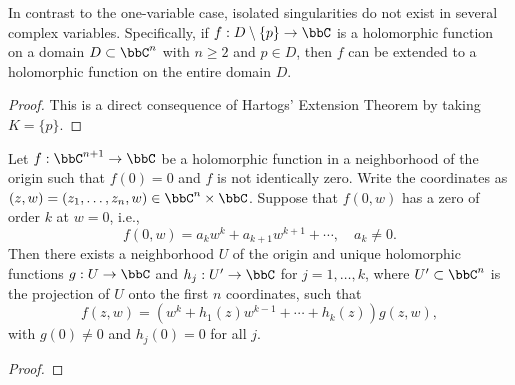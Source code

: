 \begin{corollary}\label{cor:nonexistence_of_isolated_singularities_in_several_complex_variables}
	In contrast to the one-variable case, isolated singularities do not exist in several complex variables.
	Specifically, if \(f: D \setminus \{p\} \to \bbC\) is a holomorphic function on a domain \(D \subset \bbC^n\) with \(n \geq 2\) and \(p \in D\), then \(f\) can be extended to a holomorphic function on the entire domain \(D\).
\end{corollary}
\begin{proof}
	This is a direct consequence of Hartogs' Extension Theorem by taking \(K = \{p\}\).
\end{proof}
\begin{theorem}\label{thm:Weierstrass_Preparation_Theorem}
	Let \(f: \bbC^{n+1} \to \bbC\) be a holomorphic function in a neighborhood of the origin such that \(f(0) = 0\) and \(f\) is not identically zero.
	Write the coordinates as \((z,w) = (z_1, \ldots, z_n, w) \in \bbC^{n} \times \bbC\).
	Suppose that \(f(0,w)\) has a zero of order \(k\) at \(w = 0\), i.e.,
	\[ f(0,w) = a_k w^k + a_{k+1} w^{k+1} + \cdots, \quad a_k \neq 0. \]
	Then there exists a neighborhood \(U\) of the origin and unique holomorphic functions \(g: U \to \bbC\) and \(h_j: U' \to \bbC\) for \(j = 1, \ldots, k\), where \(U' \subset \bbC^n\) is the projection of \(U\) onto the first \(n\) coordinates, such that
	\[ f(z,w) = (w^k + h_1(z) w^{k-1} + \cdots + h_k(z)) g(z,w), \]
	with \(g(0) \neq 0\) and \(h_j(0) = 0\) for all \(j\).
\end{theorem}
\begin{proof}
\end{proof}

